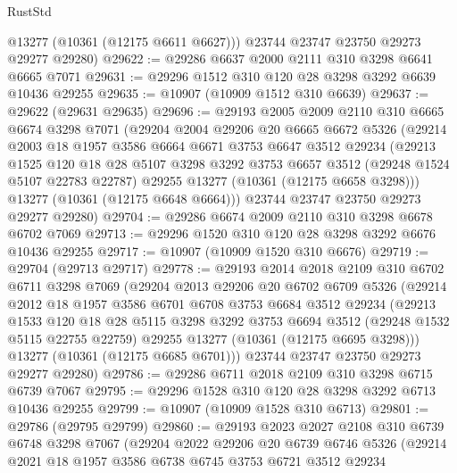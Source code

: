 \begin{lexlean}{RustStd}
\begin{coremodule}
        @13277
        (@10361 (@12175 @6611 @6627)))
      @23744
      @23747
      @23750
      @29273
      @29277
      @29280)
@29622 := @29286 @6637 @2000 @2111 @310 @3298 @6641 @6665 @7071
@29631 := @29296 @1512 @310 @120 @28 @3298 @3292 @6639 @10436 @29255
@29635 := @10907 (@10909 @1512 @310 @6639)
@29637 := @29622 (@29631 @29635)
@29696 := @29193
    @2005
    @2009
    @2110
    @310
    @6665
    @6674
    @3298
    @7071
    (@29204
      @2004
      @29206
      @20
      @6665
      @6672
      @5326
      (@29214
        @2003
        @18
        @1957
        @3586
        @6664
        @6671
        @3753
        @6647
        @3512
        @29234
        (@29213
          @1525
          @120
          @18
          @28
          @5107
          @3298
          @3292
          @3753
          @6657
          @3512
          (@29248 @1524 @5107 @22783 @22787)
          @29255
          @13277
          (@10361 (@12175 @6658 @3298)))
        @13277
        (@10361 (@12175 @6648 @6664)))
      @23744
      @23747
      @23750
      @29273
      @29277
      @29280)
@29704 := @29286 @6674 @2009 @2110 @310 @3298 @6678 @6702 @7069
@29713 := @29296 @1520 @310 @120 @28 @3298 @3292 @6676 @10436 @29255
@29717 := @10907 (@10909 @1520 @310 @6676)
@29719 := @29704 (@29713 @29717)
@29778 := @29193
    @2014
    @2018
    @2109
    @310
    @6702
    @6711
    @3298
    @7069
    (@29204
      @2013
      @29206
      @20
      @6702
      @6709
      @5326
      (@29214
        @2012
        @18
        @1957
        @3586
        @6701
        @6708
        @3753
        @6684
        @3512
        @29234
        (@29213
          @1533
          @120
          @18
          @28
          @5115
          @3298
          @3292
          @3753
          @6694
          @3512
          (@29248 @1532 @5115 @22755 @22759)
          @29255
          @13277
          (@10361 (@12175 @6695 @3298)))
        @13277
        (@10361 (@12175 @6685 @6701)))
      @23744
      @23747
      @23750
      @29273
      @29277
      @29280)
@29786 := @29286 @6711 @2018 @2109 @310 @3298 @6715 @6739 @7067
@29795 := @29296 @1528 @310 @120 @28 @3298 @3292 @6713 @10436 @29255
@29799 := @10907 (@10909 @1528 @310 @6713)
@29801 := @29786 (@29795 @29799)
@29860 := @29193
    @2023
    @2027
    @2108
    @310
    @6739
    @6748
    @3298
    @7067
    (@29204
      @2022
      @29206
      @20
      @6739
      @6746
      @5326
      (@29214
        @2021
        @18
        @1957
        @3586
        @6738
        @6745
        @3753
        @6721
        @3512
        @29234

\end{coremodule}
\end{lexlean}

